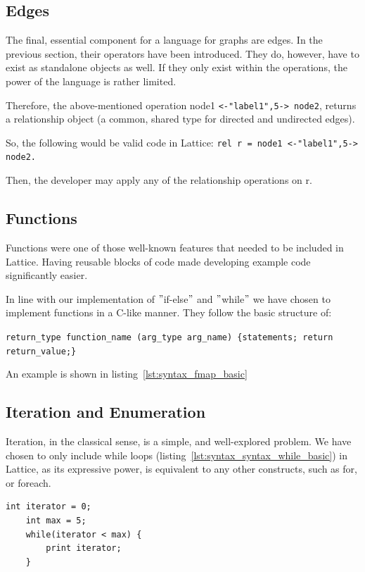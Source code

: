 \subsection{Edges}\label{subsec:syntax_edges}
The final, essential component for a language for graphs are edges.
In the previous section, their operators have been introduced.
They do, however, have to exist as standalone objects as well.
If they only exist within the operations, the power of the language is rather
limited.

Therefore, the above-mentioned operation node1 \lstinline{<-"label1",5-> node2}, returns a relationship object (a common, shared
type for directed and undirected edges).

So, the following would be valid code in Lattice: \lstinline{rel r = node1 <-"label1",5-> node2.}

Then, the developer may apply any of the relationship operations on r.

\subsection{Functions}\label{subsec:syntax_functions}
Functions were one of those well-known features that needed to be included in Lattice.
Having reusable blocks of code made developing example code significantly easier.

In line with our implementation of \("\)if-else\("\) and \("\)while\("\) we have chosen to implement functions in a C-like manner.
They follow the basic structure of:

\lstinline|return_type function_name (arg_type arg_name) {statements; return return_value;}|

An example is shown in listing~\ref{lst:syntax_fmap_basic}

\subsection{Iteration and Enumeration}\label{subsec:syntax_iteration-and-enumeration}
Iteration, in the classical sense, is a simple, and well-explored problem.
We have chosen to only include while loops (listing~\ref{lst:syntax_syntax_while_basic})
in Lattice, as its expressive power, is equivalent to any other constructs, such as for, or foreach.

\begin{lstlisting}[caption={Simple while loop.},captionpos=b,label={lst:syntax_syntax_while_basic}]
    int iterator = 0;
    int max = 5;
    while(iterator < max) {
        print iterator;
    }
\end{lstlisting}


